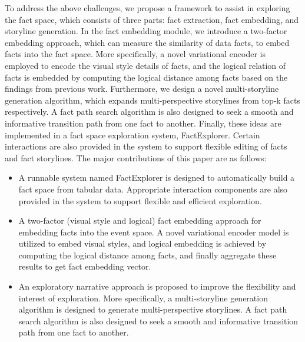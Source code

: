 To address the above challenges, we propose a framework to assist in exploring the fact space, which consists of three parts: fact extraction, fact embedding, and storyline generation. 
In the fact embedding module, we introduce a two-factor embedding approach, which can measure the similarity of data facts, to embed facts into the fact space. 
More specifically, a novel variational encoder is employed to encode the visual style details of facts, and the logical relation of facts is embedded by computing the logical distance among facts based on the findings from previous work. 
Furthermore, we design a novel multi-storyline generation algorithm, which expands multi-perspective storylines from top-k facts respectively. A fact path search algorithm is also designed to seek a smooth and informative transition path from one fact to another.
Finally, these ideas are implemented in a fact space exploration system, FactExplorer. 
Certain interactions are also provided in the system to support flexible editing of facts and fact storylines.
The major contributions of this paper are as follows:
\begin{itemize}
\item A runnable system named FactExplorer is designed to automatically build a fact space from tabular data. Appropriate interaction components are also provided in the system to support flexible and efficient exploration.
\item A two-factor (visual style and logical) fact embedding approach for embedding facts into the event space. A novel variational encoder model is utilized to embed visual styles, and logical embedding is achieved by computing the logical distance among facts, and finally aggregate these results to get fact embedding vector.
\item An exploratory narrative approach is proposed to improve the flexibility and interest of exploration. More specifically, a multi-storyline generation algorithm is designed to generate multi-perspective storylines. A fact path search algorithm is also designed to seek a smooth and informative transition path from one fact to another.
\end{itemize}